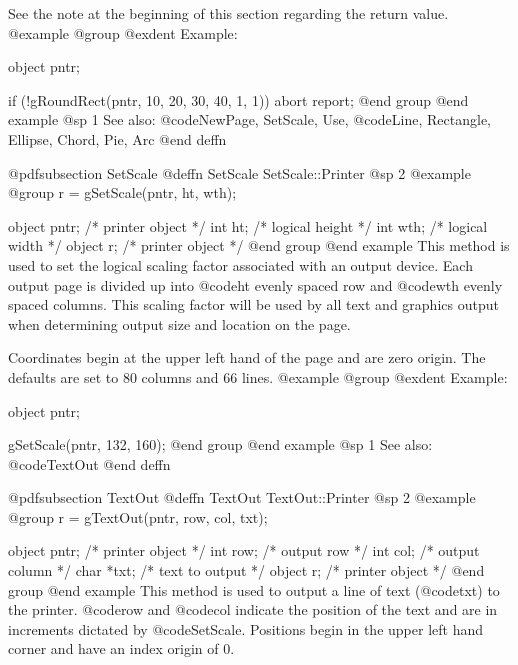 See the note at the beginning of this section regarding the return value.
@example
@group
@exdent Example:

object  pntr;

if (!gRoundRect(pntr, 10, 20, 30, 40, 1, 1))
        abort report;
@end group
@end example
@sp 1
See also:  @code{NewPage, SetScale, Use,}
        @code{Line, Rectangle, Ellipse, Chord, Pie, Arc}
@end deffn
















@pdfsubsection {SetScale}
@deffn {SetScale} SetScale::Printer
@sp 2
@example
@group
r = gSetScale(pntr, ht, wth);

object  pntr;   /*  printer object  */
int     ht;     /*  logical height  */
int     wth;    /*  logical width   */
object  r;      /*  printer object  */
@end group
@end example
This method is used to set the logical scaling factor associated with an
output device.  Each output page is divided up into @code{ht} evenly
spaced row and @code{wth} evenly spaced columns.  This scaling factor
will be used by all text and graphics output when determining output size
and location on the page.

Coordinates begin at the upper left hand of the page and are zero origin.
The defaults are set to 80 columns and 66 lines.
@example
@group
@exdent Example:

object  pntr;

gSetScale(pntr, 132, 160);
@end group
@end example
@sp 1
See also:  @code{TextOut}
@end deffn












@pdfsubsection {TextOut}
@deffn {TextOut} TextOut::Printer
@sp 2
@example
@group
r = gTextOut(pntr, row, col, txt); 

object  pntr;   /*  printer object  */
int     row;    /*  output row      */
int     col;    /*  output column   */
char    *txt;   /*  text to output  */
object  r;      /*  printer object  */
@end group
@end example
This method is used to output a line of text (@code{txt}) to the printer.
@code{row} and @code{col} indicate the position of the text and are in
increments dictated by @code{SetScale}.  Positions begin in the upper
left hand corner and have an index origin of 0.

